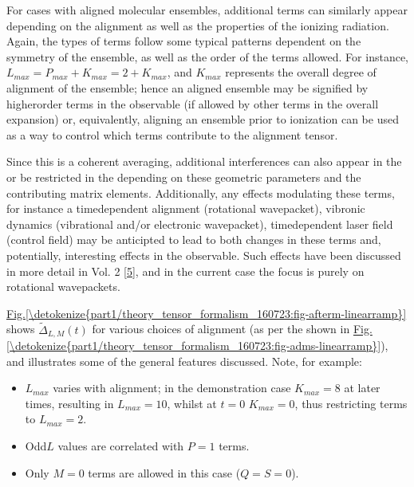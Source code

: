 \documentclass[letterpaper,table,10pt,english]{jupyterBook}
\begin{document}
\sphinxAtStartPar
For cases with aligned molecular ensembles, additional terms can similarly appear depending on the alignment as well as the properties of the ionizing radiation. Again, the types of terms follow some typical patterns dependent on the symmetry of the ensemble, as well as the order of the terms allowed. For instance, \(L_{max}=P_{max}+K_{max}=2+K_{max}\), and \(K_{max}\) represents the overall degree of alignment of the ensemble; hence an aligned ensemble may be signified by higher\sphinxhyphen{}order terms in the observable (if allowed by other terms in the overall expansion) or, equivalently, aligning an ensemble prior to ionization can be used as a way to control which terms contribute to the alignment tensor.

\sphinxAtStartPar
Since this is a coherent averaging, additional interferences can also appear in the {\hyperref[\detokenize{backmatter/glossary:term-AF}]{}} \sphinxhyphen{} or be restricted in the {\hyperref[\detokenize{backmatter/glossary:term-AF}]{}} \sphinxhyphen{} depending on these geometric parameters and the contributing matrix elements. Additionally, any effects modulating these terms, for instance a time\sphinxhyphen{}dependent alignment (rotational wavepacket), vibronic dynamics (vibrational and/or electronic wavepacket), time\sphinxhyphen{}dependent laser field (control field) may be anticipted to lead to both changes in these terms and, potentially, interesting effects in the observable. Such effects have been discussed in more detail in  Vol. 2 {[}\hyperlink{cite.backmatter/bibliography:id664}{5}{]}, and in the current case the focus is purely on rotational wavepackets.

\sphinxAtStartPar
\hyperref[\detokenize{part1/theory_tensor_formalism_160723:fig-afterm-linearramp}]{Fig.\@ \ref{\detokenize{part1/theory_tensor_formalism_160723:fig-afterm-linearramp}}} shows \(\tilde{\Delta}_{L,M}(t)\) for various choices of alignment (as per the {\hyperref[\detokenize{backmatter/glossary:term-ADMs}]{}} shown in \hyperref[\detokenize{part1/theory_tensor_formalism_160723:fig-adms-linearramp}]{Fig.\@ \ref{\detokenize{part1/theory_tensor_formalism_160723:fig-adms-linearramp}}}), and illustrates some of the general features discussed. Note, for example:
\begin{itemize}
\item {} 
\sphinxAtStartPar
\(L_{max}\) varies with alignment; in the demonstration case \(K_{max}=8\) at later times, resulting in \(L_{max}=10\), whilst at \(t=0\) \(K_{max}=0\), thus restricting terms to \(L_{max}=2\).

\item {} 
\sphinxAtStartPar
Odd\sphinxhyphen{}\(L\) values are correlated with \(P=1\) terms.

\item {} 
\sphinxAtStartPar
Only \(M=0\) terms are allowed in this case (\(Q=S=0\)).

\end{itemize}
\end{document}

